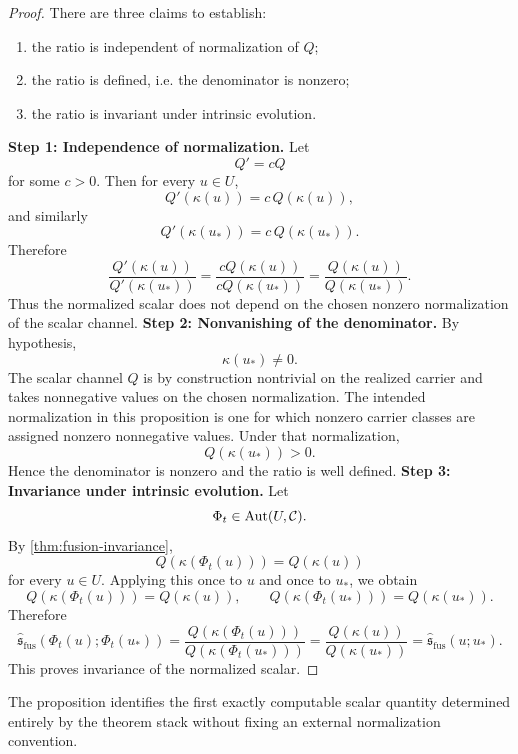 \begin{proof}
	There are three claims to establish:
	\begin{enumerate}[label=\textup{(\roman*)}]
		\item the ratio is independent of normalization of \(Q\);
		\item the ratio is defined, i.e. the denominator is nonzero;
		\item the ratio is invariant under intrinsic evolution.
	\end{enumerate}
	\medskip
	\noindent
	\textbf{Step 1: Independence of normalization.}
	Let
	\[
		Q'=cQ
	\]
	for some \(c>0\).
	Then for every \(u\in U\),
	\[
		Q'(\kappa(u))=c\,Q(\kappa(u)),
	\]
	and similarly
	\[
		Q'(\kappa(u_*))=c\,Q(\kappa(u_*)).
	\]
	Therefore
	\[
		\frac{Q'(\kappa(u))}{Q'(\kappa(u_*))}
		=
		\frac{cQ(\kappa(u))}{cQ(\kappa(u_*))}
		=
		\frac{Q(\kappa(u))}{Q(\kappa(u_*))}.
	\]
	Thus the normalized scalar does not depend on the chosen nonzero
	normalization of the scalar channel.
	\medskip
	\noindent
	\textbf{Step 2: Nonvanishing of the denominator.}
	By hypothesis,
	\[
		\kappa(u_*)\neq 0.
	\]
	The scalar channel \(Q\) is by construction nontrivial on the realized
	carrier and takes nonnegative values on the chosen normalization.
	The intended normalization in this proposition is one for which nonzero
	carrier classes are assigned nonzero nonnegative values. Under that
	normalization,
	\[
		Q(\kappa(u_*))>0.
	\]
	Hence the denominator is nonzero and the ratio is well defined.
	\medskip
	\noindent
	\textbf{Step 3: Invariance under intrinsic evolution.}
	Let
	\[
		\Phi_t\in \operatorname{Aut}(U,\mathcal C).
	\]
	By \cref{thm:fusion-invariance},
	\[
		Q(\kappa(\Phi_t(u)))=Q(\kappa(u))
	\]
	for every \(u\in U\).
	Applying this once to \(u\) and once to \(u_*\), we obtain
	\[
		Q(\kappa(\Phi_t(u)))=Q(\kappa(u)),
		\qquad
		Q(\kappa(\Phi_t(u_*)))=Q(\kappa(u_*)).
	\]
	Therefore
	\[
		\widehat{\mathfrak s}_{\mathrm{fus}}(\Phi_t(u);\Phi_t(u_*))
		=
		\frac{Q(\kappa(\Phi_t(u)))}{Q(\kappa(\Phi_t(u_*)))}
		=
		\frac{Q(\kappa(u))}{Q(\kappa(u_*))}
		=
		\widehat{\mathfrak s}_{\mathrm{fus}}(u;u_*).
	\]
	This proves invariance of the normalized scalar.
\end{proof}
\begin{remark}
	The proposition identifies the first exactly computable scalar quantity
	determined entirely by the theorem stack without fixing an external
	normalization convention.
\end{remark}
